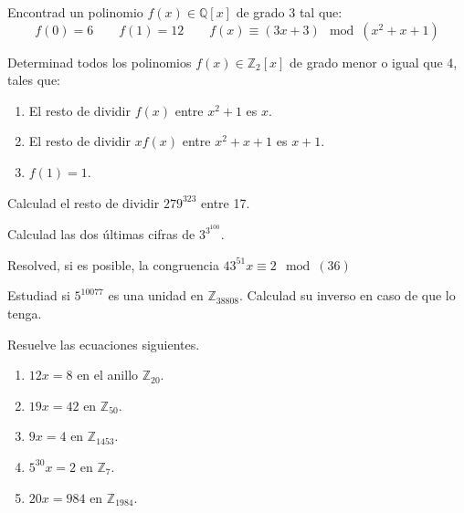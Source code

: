\begin{ejercicio}
    Encontrad un polinomio $f(x)\in \mathbb{Q}[x]$ de grado 3 tal que:
    \begin{equation*}
        f(0) = 6\qquad f(1)=12\qquad f(x)\equiv(3x+3)\mod(x^2+x+1)
    \end{equation*}
\end{ejercicio}

\begin{ejercicio}
    Determinad todos los polinomios $f(x)\in \mathbb{Z}_2[x]$ de grado menor o igual que 4, tales que:
    \begin{enumerate}
        \item El resto de dividir $f(x)$ entre $x^2+1$ es $x$.
        \item El resto de dividir $xf(x)$ entre $x^2+x+1$ es $x+1$.
        \item $f(1)=1$.
    \end{enumerate}
\end{ejercicio}

\begin{ejercicio}
    Calculad el resto de dividir $279^{323}$ entre 17.
\end{ejercicio}

\begin{ejercicio}
    Calculad las dos últimas cifras de $3^{3^{100}}$.
\end{ejercicio}

\begin{ejercicio}
    Resolved, si es posible, la congruencia $43^{51}x\equiv 2\mod(36)$
\end{ejercicio}

\begin{ejercicio}
    Estudiad si $5^{10077}$ es una unidad en $\mathbb{Z}_{38808}$. Calculad su inverso en caso de que lo tenga.
\end{ejercicio}

\begin{ejercicio}
    Resuelve las ecuaciones siguientes.
    \begin{enumerate}
        \item $12x=8$ en el anillo $\mathbb{Z}_{20}$.
        \item $19x=42$ en $\mathbb{Z}_{50}$.
        \item $9x=4$ en $\mathbb{Z}_{1453}$.
        \item $5^{30}x=2$ en $\mathbb{Z}_{7}$.
        \item $20x=984$ en $\mathbb{Z}_{1984}$.
    \end{enumerate}
\end{ejercicio}

